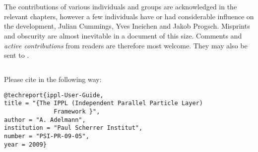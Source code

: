\clearpage
\section{}
The contributions of various individuals and groups are acknowledged in the relevant chapters,
however a few individuals have or had considerable influence on the
development, Julian Cummings, Yves Ineichen and Jakob Progsch.
Misprints and obscurity are almost inevitable in a document of this size.
Comments and {\em active contributions}  from readers are therefore most welcome.
They may also be sent to .

\subsection{}
Please cite \ippl in the following way:
\begin{small}
\begin{verbatim}
@techreport{ippl-User-Guide,
title = "{The IPPL (Independent Parallel Particle Layer)
              Framework }",
author = "A. Adelmann",
institution = "Paul Scherrer Institut",
number = "PSI-PR-09-05",
year = 2009}
\end{verbatim}
\end{small}




